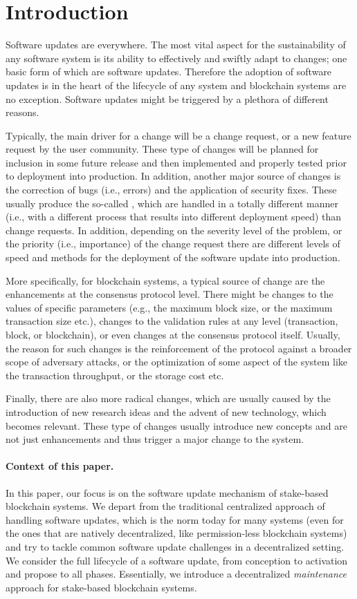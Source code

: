 \section{Introduction}
Software updates are everywhere. The most vital aspect for the sustainability of any software system is its ability to effectively and swiftly adapt to changes; one basic form of which are software updates. Therefore the adoption of software updates is in the heart of the lifecycle of any system and blockchain systems are no exception. Software updates might be triggered by a plethora of different reasons. 

Typically, the main driver for a change will be a change request, or a new feature request by the user community. These type of changes will be planned for inclusion in some future release and then implemented and properly tested prior to deployment into production. In addition, another major source of changes is the correction of bugs (i.e., errors) and the application of security fixes. These usually produce the so-called , which are handled in a totally different manner (i.e., with a different process that results into different deployment speed) than change requests. In addition, depending on the severity level of the problem, or the priority (i.e., importance) of the change request there are different levels of speed and methods for the deployment of the software update into production. 

More specifically, for blockchain systems, a typical source of change are the enhancements at the consensus protocol level. There might be changes to the values of specific parameters (e.g., the maximum block size, or the maximum transaction size etc.), changes to the validation rules at any level (transaction, block, or blockchain), or even changes at the consensus protocol itself. Usually, the reason for such changes is the reinforcement of the protocol against a broader scope of adversary attacks, or the optimization of some aspect of the system like the transaction throughput, or the storage cost etc.

Finally, there are also more radical changes, which are usually caused by the introduction of new research ideas  and the advent of new technology, which becomes relevant. These type of changes usually introduce new concepts and are not just enhancements and thus trigger a major change to the system.

\paragraph{Context of this paper.} 
In this paper, our focus is on the software update mechanism of stake-based blockchain systems. We depart from the traditional centralized approach of handling software updates, which is the norm today for many systems (even for the ones that are natively decentralized, like permission-less blockchain systems) and try to tackle common software update challenges in a decentralized setting. We consider the full lifecycle of a software update, from conception to activation and propose  to all phases. Essentially, we introduce a decentralized \emph{maintenance} approach for stake-based blockchain systems.

